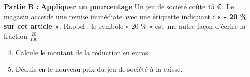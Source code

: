 \documentclass[a4paper]{book}
\begin{document}
    \medskip
    \textbf{Partie B : Appliquer un pourcentage} \newline
    Un jeu de société coûte $45~\text{\euro}$. Le magasin accorde une remise immédiate avec une étiquette indiquant : \textbf{« - 20 \% sur cet article »}. Rappel : le symbole « 20 \% » est une autre façon d'écrire la fraction $\frac{20}{100}$.
    
    \begin{enumerate}
        \setcounter{enumi}{3}
        \item Calcule le montant de la réduction en euros. 
        \item Déduis-en le nouveau prix du jeu de société à la caisse.
    \end{enumerate}
\end{document}
